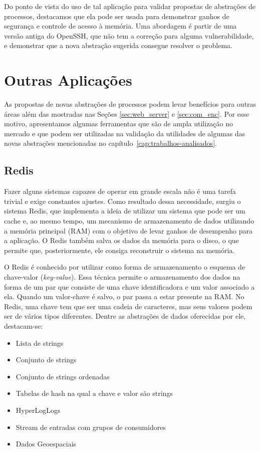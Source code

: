 Do ponto de vista do uso de tal aplicação para validar propostas de abstrações
de processos, destacamos que ela pode ser usada para demonstrar ganhos de
segurança e controle de acesso à memória. Uma abordagem é partir de uma versão
antiga do OpenSSH, que não tem a correção para alguma vulnerabilidade, e
demonstrar que a nova abstração sugerida consegue resolver o problema.

\section{Outras Aplicações}

As propostas de novas abstrações de processos podem levar benefícios para
outras áreas além das mostradas nas Seções \ref{sec:web_server} e
\ref{sec:com_enc}. Por esse motivo, apresentamos algumas ferramentas que são de
ampla utilização no mercado e que podem ser utilizadas na validação da
utilidades de algumas das novas abstrações mencionadas no
capítulo~\ref{cap:trabalhos-analisados}.

\subsection{Redis}

Fazer alguns sistemas capazes de operar em grande escala não é uma tarefa trivial e exige constantes
ajustes. Como resultado dessa necessidade, surgiu o sistema Redis, que
implementa a ideia de utilizar um sistema que pode ser um cache e, ao mesmo tempo,
um mecanismo de armazenamento de dados utilizando a memória principal (RAM) com o objetivo
de levar ganhos de desempenho para a aplicação. O Redis também salva os dados
da memória para o disco, o que permite que, posteriormente, ele consiga
reconstruir o sistema na memória.

O Redis é conhecido por utilizar como forma de armazenamento o esquema de
chave-valor (\emph{key-value}). Essa técnica permite o armazenamento dos dados na
forma de um par que consiste de uma chave identificadora e um valor associado a
ela. Quando um valor-chave é salvo, o par passa a estar presente na
RAM. No Redis, uma chave tem que ser uma cadeia de caracteres, mas seus valores podem ser de
vários tipos diferentes. Dentre as abstrações de dados oferecidas por ele, destacam-se:

\begin{itemize}
  \item Lista de strings
  \item Conjunto de strings
  \item Conjunto de strings ordenadas
  \item Tabelas de hash na qual a chave e valor são strings
  \item HyperLogLogs
  \item Stream de entradas com grupos de consumidores
  \item Dados Geoespaciais
\end{itemize}

